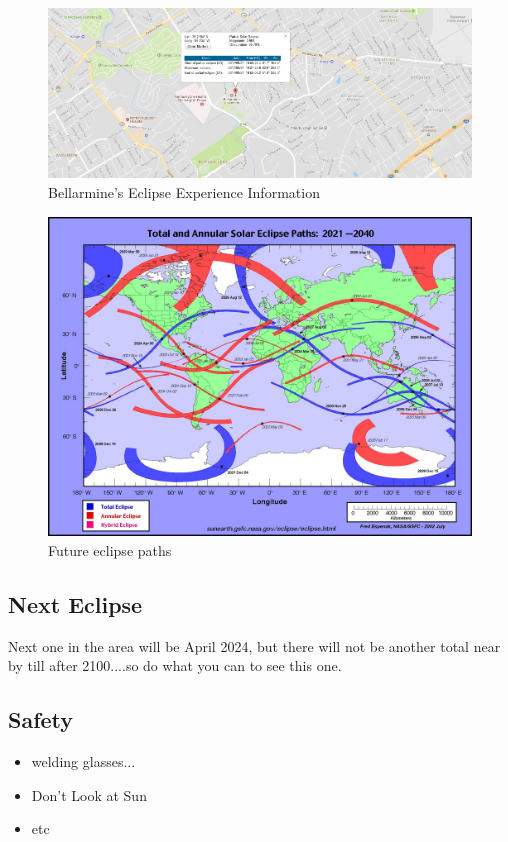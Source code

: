 \documentclass{article}
\begin{document}
\begin{figure}
\includegraphics[scale=.9]{Pictures/Local_Bellarmine_Data.jpg}
\caption{Bellarmine's Eclipse Experience Information}
\end{figure}

\begin{figure}
\includegraphics[scale=.75]{Pictures/SEatlas2021.jpg}
\caption{Future eclipse paths}
\end{figure}

\subsection{Next Eclipse}
Next one in the area will be April 2024, but there will not be another total near by till after 2100....so do what you can to see this one.

\subsection{Safety}
\begin{itemize}
\item welding glasses...
\item Don't Look at Sun
\item etc
\end{itemize}
\end{document}
